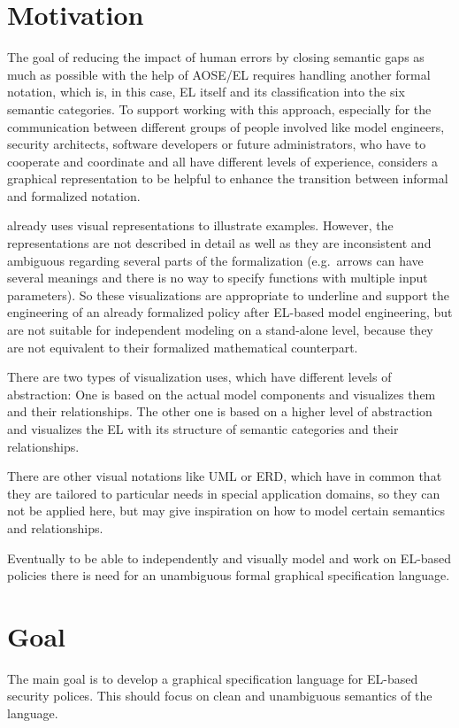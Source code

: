 \documentclass[12pt,a4paper]{article}
\begin{document}
\section{Motivation} 
The goal of reducing the impact of human errors by closing semantic gaps as much as possible with the help of AOSE/EL requires handling another formal notation, which is, in this case, EL itself and its classification into the six semantic categories.
To support working with this approach, especially for the communication between different groups of people involved like model engineers, security architects, software developers or future administrators, who have to cooperate and coordinate and all have different levels of experience, \citet*{Amthor18} considers a graphical representation to be helpful to enhance the transition between informal and formalized notation.

\citet*{Amthor18} already uses visual representations to illustrate examples.
However, the representations are not described in detail as well as they are inconsistent and ambiguous regarding several parts of the formalization (e.g.\ arrows can have several meanings and there is no way to specify functions with multiple input parameters).
So these visualizations are appropriate to underline and support the engineering of an already formalized policy after EL-based model engineering, but are not suitable for independent modeling on a stand-alone level, because they are not equivalent to their formalized mathematical counterpart.

There are two types of visualization \cite{Amthor18} uses, which have different levels of abstraction: 
One is based on the actual model components and visualizes them and their relationships.
The other one is based on a higher level of abstraction and visualizes the EL with its structure of semantic categories and their relationships.

There are other visual notations like UML or ERD, which have in common that they are tailored to particular needs in special application domains, so they can not be applied here, but may give inspiration on how to model certain semantics and relationships.

Eventually to be able to independently and visually model and work on EL-based policies there is need for an unambiguous formal graphical specification language.


\section{Goal} 
The main goal is to develop a graphical specification language for EL-based security polices.
This should focus on clean and unambiguous semantics of the language.
\end{document}
